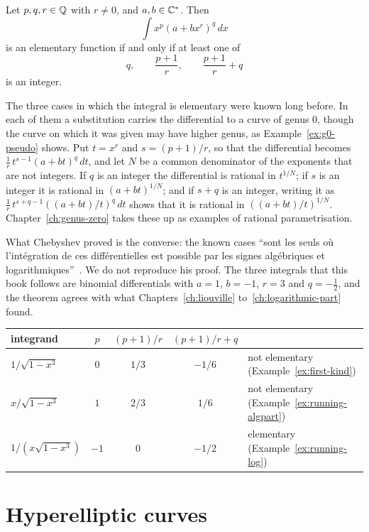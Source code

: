 \begin{theorem}[Chebyshev]\label{thm:chebyshev}
Let $p, q, r \in \mathbb{Q}$ with $r \ne 0$, and $a, b \in \mathbb{C}^*$. Then
\[
  \int x^p (a + b x^r)^q\, dx
\]
is an elementary function if and only if at least one of
\[
  q, \qquad \frac{p + 1}{r}, \qquad \frac{p + 1}{r} + q
\]
is an integer.
\end{theorem}

The three cases in which the integral is elementary were known long before.
In each of them a substitution carries the differential to a curve of genus
$0$, though the curve on which it was given may have higher genus, as
Example~\ref{ex:g0-pseudo} shows. Put $t = x^r$ and $s = (p + 1)/r$, so that the differential
becomes $\frac1r\, t^{s-1} (a + b t)^q\,dt$, and let $N$ be a common
denominator of the exponents that are not integers. If $q$ is an integer the
differential is rational in $t^{1/N}$; if $s$ is an integer it is rational in
$(a + b t)^{1/N}$; and if $s + q$ is an integer, writing it as $\frac1r\,
t^{s+q-1} ((a + b t)/t)^q\,dt$ shows that it is rational in $((a + b
t)/t)^{1/N}$. Chapter~\ref{ch:genus-zero} takes these up as examples of
rational parametrisation.

What Chebyshev proved is the converse: the known cases ``sont les seuls o\`u
l'int\'egration de ces diff\'erentielles est possible par les signes
alg\'ebriques et logarithmiques''~\cite[introduction]{chebyshev1853}. We do not
reproduce his proof. The three integrals that this book follows are binomial
differentials with $a = 1$, $b = -1$, $r = 3$ and $q = -\frac12$, and the
theorem agrees with what Chapters~\ref{ch:liouville}
to~\ref{ch:logarithmic-part} found.
\begin{center}
\begin{tabular}{@{}lcccl@{}}
\toprule
integrand & $p$ & $(p+1)/r$ & $(p+1)/r + q$ & \\
\midrule
$1/\sqrt{1 - x^3}$     & $0$  & $1/3$ & $-1/6$ & not elementary (Example~\ref{ex:first-kind}) \\
$x/\sqrt{1 - x^3}$     & $1$  & $2/3$ & $1/6$  & not elementary (Example~\ref{ex:running-algpart}) \\
$1/(x\sqrt{1 - x^3})$  & $-1$ & $0$   & $-1/2$ & elementary (Example~\ref{ex:running-log}) \\
\bottomrule
\end{tabular}
\end{center}

\section{Hyperelliptic curves}\label{sec:radical-hyperelliptic}

